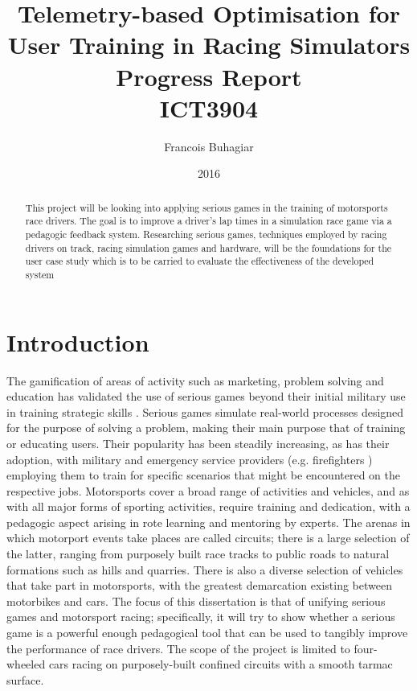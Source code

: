 \documentclass{article}
\title{Telemetry-based Optimisation for User Training in Racing Simulators \\ Progress Report \\ 
ICT3904}
\author{Francois Buhagiar}
\date{2016}
\begin{document}

\maketitle
\newpage
\tableofcontents

\setcounter{page}{1}

\newpage
\begin{abstract}
This project will be looking into applying serious games in the training of motorsports race drivers. The goal is to improve a driver's lap times in a simulation race game via a pedagogic feedback system. Researching serious games, techniques employed by racing drivers on track, racing simulation games and hardware, will be the foundations for the user case study which is to be carried to evaluate the effectiveness of the developed system
\end{abstract}

\newpage
\section{Introduction}
The gamification of areas of activity such as marketing, problem solving and education \cite{michael2005serious} has validated the use of serious games beyond their initial military use in training strategic skills \cite{djaouti2011classifying}.  Serious games simulate real-world processes designed for the purpose of solving a problem, making their main purpose that of training or educating users. Their popularity has been steadily increasing, as has their adoption, with military \cite{djaouti2011classifying} and emergency service providers (e.g. firefighters \cite{michael2005serious}) employing them to train for specific scenarios that might be encountered on the respective jobs. Motorsports cover a broad range of activities and vehicles, and as with all major forms of sporting activities, require training and dedication, with a pedagogic aspect arising in rote learning and mentoring by experts. The arenas in which motorport events take places are called circuits; there is a large selection of the latter, ranging from purposely built race tracks to public roads to natural formations such as hills and quarries. There is also a diverse selection of vehicles that take part in motorsports, with the greatest demarcation existing between motorbikes and cars. The focus of this dissertation is that of unifying serious games and motorsport racing; specifically, it will try to show whether a serious game is a powerful enough pedagogical tool that can be used to tangibly improve the performance of race drivers. The scope of the project is limited to four-wheeled cars racing on purposely-built confined circuits with a smooth tarmac surface.  
\end{document}
